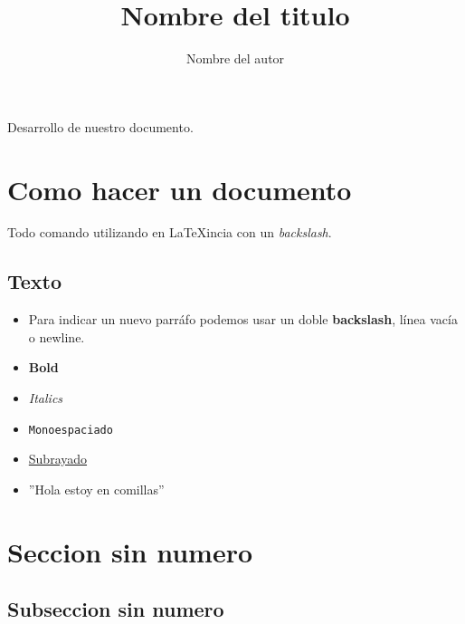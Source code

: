 \documentclass[10pt,a4paper]{article}
\title{Nombre del titulo} %
\author{Nombre del autor} %
\date{} %
\begin{document}
\maketitle %

Desarrollo de nuestro documento.

\section{Como hacer un documento} %

Todo comando utilizando en \LaTeX incia con un \textit{backslash}.

\subsection{Texto} %

\begin{itemize}
    \item Para indicar un nuevo parráfo podemos usar un doble \textbf{backslash}, línea vacía o newline.
    \item \textbf{Bold}
    \item \textit{Italics}
    \item \texttt{Monoespaciado}
    \item \underline{Subrayado}
    \item ''Hola estoy en comillas''
\end{itemize}

\newpage %

\section*{Seccion sin numero}

\subsection*{Subseccion sin numero}
\end{document}
